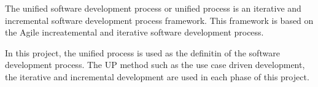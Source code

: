The unified software development process or unified process is an iterative and incremental software development process framework.
This framework is based on the Agile increatemental and iterative software development process.

In this project, the unified process is used as the definitin of the software development process.
The UP method such as the use case driven development, the iterative and incremental development are used in each phase of this project.
